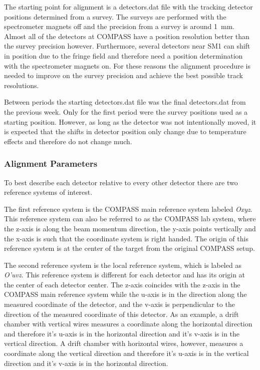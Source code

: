 The starting point for alignment is a detectors.dat file with the tracking
detector positions determined from a survey.  The surveys are performed with the
spectrometer magnets off and the precision from a survey is around 1~mm.  Almost
all of the detectors at COMPASS have a position resolution better than the
survey precision however.  Furthermore, several detectors near SM1 can shift in
position due to the fringe field and therefore need a position determination
with the spectrometer magnets on.  For these reasons the alignment procedure is
needed to improve on the survey precision and achieve the best possible track
resolutions.

Between periods the starting detectors.dat file was the final detectors.dat from
the previous week.  Only for the first period were the survey positions used as
a starting position.  However, as long as the detector was not intentionally
moved, it is expected that the shifts in detector position only change due to
temperature effects and therefore do not change much.

\subsubsection{Alignment Parameters}

To best describe each detector relative to every other detector there are two
reference systems of interest.

The first reference system is the COMPASS main reference system labeled
\textit{Oxyz}.  This reference system can also be referred to as the COMPASS lab
system, where the z-axis is along the beam momentum direction, the y-axis points
vertically and the x-axis is such that the coordinate system is right handed.
The origin of this reference system is at the center of the target from the
original COMPASS setup.

The second reference system is the local reference system, which is labeled as
\textit{O'uvz}.  This reference system is different for each detector and has
its origin at the center of each detector center.  The z-axis coincides with the
z-axis in the COMPASS main reference system while the u-axis is in the direction
along the measured coordinate of the detector, and the v-axis is perpendicular to
the direction of the measured coordinate of this detector.  As an example, a drift
chamber with vertical wires measures a coordinate along the horizontal direction
and therefore it's u-axis is in the horizontal direction and it's v-axis is in
the vertical direction.  A drift chamber with horizontal wires, however,
measures a coordinate along the vertical direction and therefore it's u-axis is
in the vertical direction and it's v-axis is in the horizontal direction.

